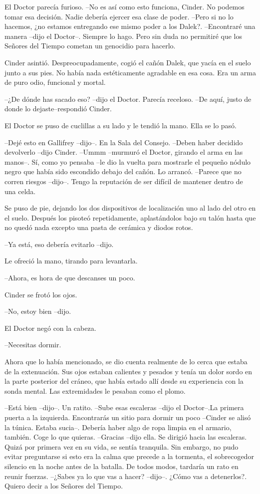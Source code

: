 El Doctor parecía furioso. 
--No es así como esto funciona, Cinder. No podemos tomar esa decisión. Nadie debería ejercer esa clase de poder.
--Pero si no lo hacemos, ¿no estamos entregando ese mismo poder a los Dalek?.
--Encontraré una manera --dijo el Doctor--. Siempre lo hago. Pero sin duda no permitiré que los Señores del Tiempo cometan un genocidio para hacerlo.

Cinder asintió. Despreocupadamente, cogió el cañón Dalek, que yacía en el suelo junto a sus pies. No había nada estéticamente agradable en esa cosa. Era un arma de puro odio, funcional y mortal.

--¿De dónde has sacado eso? --dijo el Doctor. Parecía receloso.
--De aquí, justo de donde lo dejaste--respondió Cinder.

El Doctor se puso de cuclillas a su lado y le tendió la mano. Ella se lo pasó. 

--Dejé esto en Gallifrey --dijo--. En la Sala del Consejo.
--Deben haber decidido devolverlo --dijo Cinder.
--Ummm --murmuró el Doctor, girando el arma en las manos--. Sí, como yo pensaba --le dio la vuelta para mostrarle el pequeño nódulo negro que había sido escondido debajo del cañón. Lo arrancó.
--Parece que no corren riesgos --dijo--. Tengo la reputación de ser difícil de mantener dentro de una celda.

Se puso de pie, dejando los dos dispositivos de localización uno al lado del otro en el suelo. Después los pisoteó repetidamente, aplastándolos bajo su talón hasta que no quedó nada excepto una pasta de cerámica y diodos rotos. 

--Ya está, eso debería evitarlo --dijo.

Le ofreció la mano, tirando para levantarla. 

--Ahora, es hora de que descanses un poco.

Cinder se frotó los ojos. 

--No, estoy bien --dijo.

El Doctor negó con la cabeza. 

--Necesitas dormir.

Ahora que lo había mencionado, se dio cuenta realmente de lo cerca que estaba de la extenuación. Sus ojos estaban calientes y pesados ​​y tenía un dolor sordo en la parte posterior del cráneo, que había estado allí desde su experiencia con la sonda mental. Las extremidades le pesaban como el plomo. 

--Está bien --dijo--. Un ratito.
--Sube esas escaleras --dijo el Doctor--.La primera puerta a la izquierda. Encontrarás un sitio para dormir un poco --Cinder se alisó la túnica. Estaba sucia--. Debería haber algo de ropa limpia en el armario, también. Coge lo que quieras.
--Gracias --dijo ella. Se dirigió hacia las escaleras. Quizá por primera vez en su vida, se sentía tranquila. Sin embargo, no pudo evitar preguntarse si esto era la calma que precede a la tormenta, el sobrecogedor silencio en la noche antes de la batalla. De todos modos, tardaría un rato en reunir fuerzas.
--¿Sabes ya lo que vas a hacer? --dijo--. ¿Cómo vas a detenerlos?. Quiero decir a los Señores del Tiempo.

